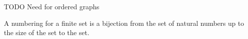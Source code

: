 


TODO
Need for ordered graphs


A numbering for a finite set is a bijection from the set of natural numbers up to the size of the set to the set.

